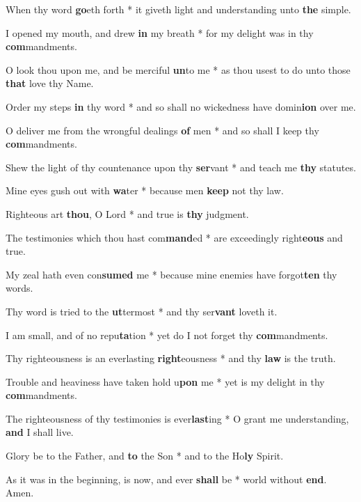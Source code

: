 \begin{multicols}{2}
	When thy word \textbf{go}eth forth * it giveth light and understanding unto \textbf{the} simple.
	
	I opened my mouth, and drew \textbf{in} my breath * for my delight was in thy \textbf{com}mandments.
	
	O look thou upon me, and be merciful \textbf{un}to me * as thou usest to do unto those \textbf{that} love thy Name.
	
	Order my steps \textbf{in} thy word * and so shall no wickedness have domin\textbf{ion} over me.
	
	O deliver me from the wrongful dealings \textbf{of} men * and so shall I keep thy \textbf{com}mandments.
	
	Shew the light of thy countenance upon thy \textbf{ser}vant * and teach me \textbf{thy} statutes.
	
	Mine eyes gush out with \textbf{wa}ter * because men \textbf{keep} not thy law.
	
	Righteous art \textbf{thou}, O Lord * and true is \textbf{thy} judgment.
	
	The testimonies which thou hast com\textbf{mand}ed * are exceedingly right\textbf{eous} and true.
	
	My zeal hath even con\textbf{sumed} me * because mine enemies have forgot\textbf{ten} thy words.
	
	Thy word is tried to the \textbf{ut}termost * and thy ser\textbf{vant} loveth it.
	
	I am small, and of no repu\textbf{ta}tion * yet do I not forget thy \textbf{com}mandments.
	
	Thy righteousness is an everlasting \textbf{right}eousness * and thy \textbf{law} is the truth.
	
	Trouble and heaviness have taken hold u\textbf{pon} me * yet is my delight in thy \textbf{com}mandments.
	
	The righteousness of thy testimonies is ever\textbf{last}ing * O grant me understanding, \textbf{and} I shall live.
	
	Glory be to the Father, and \textbf{to} the Son * and to the Ho\textbf{ly} Spirit.
	
	As it was in the beginning, is now, and ever \textbf{shall} be * world without \textbf{end}. Amen.
\end{multicols}